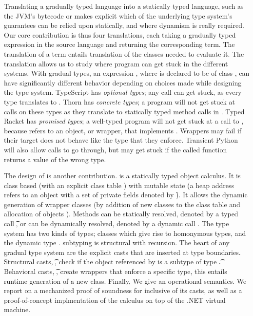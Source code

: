 \documentclass[acmsmall, anonymous, authordraft, review]{acmart} %
\begin{document}
Translating a gradually typed language into a statically typed language,
such as the JVM's bytecode or \kafka makes explicit which of the underlying
type system's guarantees can be relied upon statically, and where dynamism
is really required.  Our core contribution is thus four translations, each
taking a gradually typed expression \HT\e\T in the source language and
returning the corresponding \kafka term. The translation of a term entails
translation of the classes needed to evaluate it.  The translation allows us
to study where program can get stuck in the different systems.  With gradual
types, an expression \Call\x\m\e, where \x is declared to be of class \C,
can have significantly different behavior depending on choices made while
designing the type system. TypeScript has \emph{optional types}; any call
can get stuck, as every type translates to \any. Thorn has \emph{concrete
  types}; a program will not get stuck at calls on these types as they
translate to statically typed method calls in \kafka. Typed Racket has
\emph{promised types}; a well-typed program will not get stuck at a call to
\m, because \x refers to an object, or wrapper, that implements \m. Wrappers
may fail if their target does not behave like the type that they
enforce. Transient Python will also allow calls to go through, but may get
stuck if the called function returns a value of the wrong type.

The design of \kafka is another contribution.  \kafka is a statically typed
object calculus.  It is class based (with an explicit class table \K) with
mutable state (a heap address \a refers to an object with a set of private
fields denoted by \f). It allows the dynamic generation of wrapper classes
(by addition of new classes to the class table \K and allocation of objects
\a).  Methods can be statically resolved, denoted by a typed call
\KCall\a\m\x\t\tp, or can be dynamically resolved, denoted by a dynamic call
\DynCall\a\m\x. The \kafka type system has two kinds of types; classes which
give rise to homonymous types, and the dynamic type \any.  \kafka subtyping
is structural with recursion.  The heart of any gradual type system are the
explicit casts that are inserted at type boundaries.  Structural casts,
\SubCast\t\a, check if the object referenced by \a is a subtype of type \t.
Behavioral casts, \BehCast\t\a, create wrappers that enforce a specific
type, this entails runtime generation of a new class. Finally, We give
\kafka an operational semantics. We report on a mechanized proof of
soundness for \kafka inclusive of its casts, as well as a proof-of-concept
implmentation of the calculus on top of the .NET virtual machine.
\end{document}
